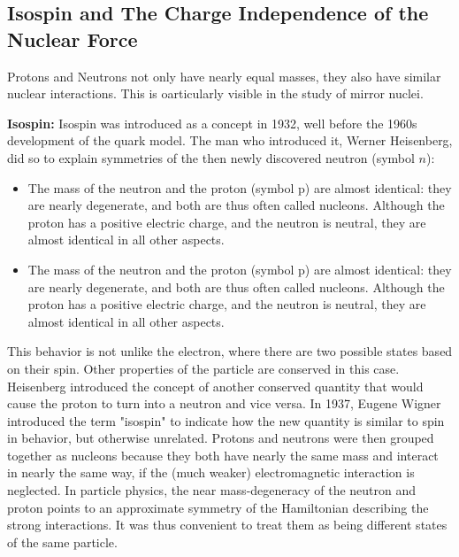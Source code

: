 \documentclass[10pt,a4paper]{article}
\begin{document}
\subsection{Isospin and The Charge  Independence of the Nuclear Force}
Protons and Neutrons not only have nearly equal masses, they also have similar nuclear interactions. This is oarticularly visible in the study of mirror nuclei.

\textbf{Isospin:} Isospin was introduced as a concept in 1932, well before the 1960s development of the quark model. The man who introduced it, Werner Heisenberg, did so to explain symmetries of the then newly discovered neutron (symbol $n$):
\begin{itemize}
    \item The mass of the neutron and the proton (symbol p) are almost identical: they are nearly degenerate, and both are thus often called nucleons. Although the proton has a positive electric charge, and the neutron is neutral, they are almost identical in all other aspects.
    \item The mass of the neutron and the proton (symbol p) are almost identical: they are nearly degenerate, and both are thus often called nucleons. Although the proton has a positive electric charge, and the neutron is neutral, they are almost identical in all other aspects.
\end{itemize}

This behavior is not unlike the electron, where there are two possible states based on their spin. Other properties of the particle are conserved in this case. Heisenberg introduced the concept of another conserved quantity that would cause the proton to turn into a neutron and vice versa. In 1937, Eugene Wigner introduced the term "isospin" to indicate how the new quantity is similar to spin in behavior, but otherwise unrelated. Protons and neutrons were then grouped together as nucleons because they both have nearly the same mass and interact in nearly the same way, if the (much weaker) electromagnetic interaction is neglected. In particle physics, the near mass-degeneracy of the neutron and proton points to an approximate symmetry of the Hamiltonian describing the strong interactions. It was thus convenient to treat them as being different states of the same particle.
\end{document}
